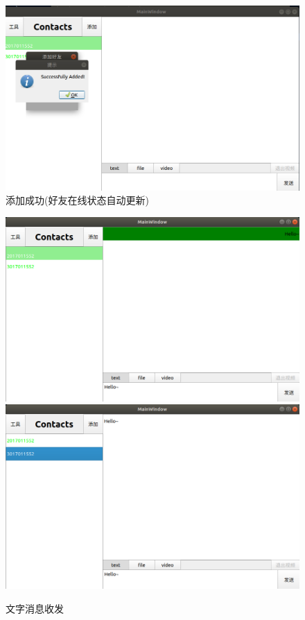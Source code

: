 \documentclass[UTF8]{ctexart}
\begin{document}
\begin{figure}[H]
    \centering
    \includegraphics[scale=0.3]{succesadd.png}
    \caption{添加成功(好友在线状态自动更新)}
\end{figure}
\begin{figure}[H]
    \centering
    \includegraphics[scale=0.18]{sendtext.png}
    \includegraphics[scale=0.18]{recvtext.png}
    \caption{文字消息收发}
\end{figure}
\end{document}
